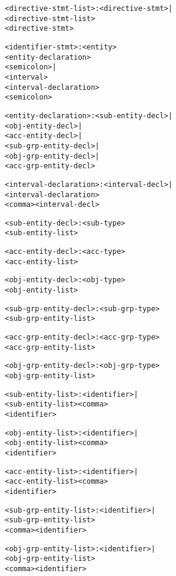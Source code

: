 \documentclass[11pt]{report}
\newenvironment{vverbatim}
{
  \begin{alltt}
}
{
    \vspace{-\baselineskip}
  \end{alltt}
}
\begin{document}
\begin{vverbatim}
<directive-stmt-list>    : <directive-stmt> |
                           <directive-stmt-list>
                           <directive-stmt>

<identifier-stmt>        : <entity>
                           <entity-declaration>
                           <semicolon> |
                           <interval>
                           <interval-declaration>
                           <semicolon>

<entity-declaration>     : <sub-entity-decl> |
                           <obj-entity-decl> |
                           <acc-entity-decl> |
                           <sub-grp-entity-decl> |
                           <obj-grp-entity-decl> |
                           <acc-grp-entity-decl>

<interval-declaration>   : <interval-decl> |
                           <interval-declaration>
                           <comma> <interval-decl>

<sub-entity-decl>        : <sub-type>
                           <sub-entity-list>

<acc-entity-decl>        : <acc-type>
                           <acc-entity-list>

<obj-entity-decl>        : <obj-type>
                           <obj-entity-list>

<sub-grp-entity-decl>    : <sub-grp-type>
                           <sub-grp-entity-list>

<acc-grp-entity-decl>    : <acc-grp-type>
                           <acc-grp-entity-list>

<obj-grp-entity-decl>    : <obj-grp-type>
                           <obj-grp-entity-list>

<sub-entity-list>        : <identifier> |
                           <sub-entity-list> <comma>
                           <identifier>

<obj-entity-list>        : <identifier> |
                           <obj-entity-list> <comma>
                           <identifier>

<acc-entity-list>        : <identifier> |
                           <acc-entity-list> <comma>
                           <identifier>

<sub-grp-entity-list>    : <identifier> |
                           <sub-grp-entity-list>
                           <comma> <identifier>

<obj-grp-entity-list>    : <identifier> |
                           <obj-grp-entity-list>
                           <comma> <identifier>


\end{vverbatim}
\end{document}
